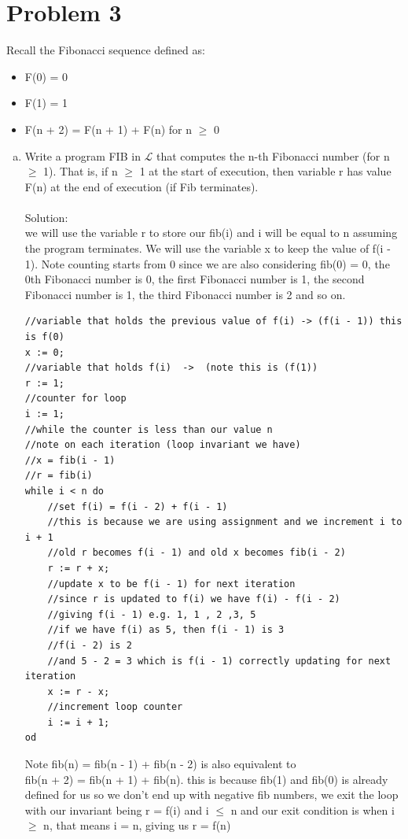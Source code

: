 \documentclass{article}
\newcommand*\moveToRight[1]{\hspace*{0em plus 1fill}\makebox{(#1)}}
\begin{document}
\section{Problem 3}
Recall the Fibonacci sequence defined as:
\begin{itemize}
    \item F(0) = 0
    \item F(1) = 1
    \item F(n + 2) = F(n + 1) + F(n) for n $\geq$ 0
\end{itemize}
    \begin{enumerate}[(a)]
        \item Write a program FIB in $\mathcal{L}$ that computes the n-th Fibonacci number (for n $\geq$ 1). That is, if n $\geq$ 1 at the start of execution, then variable r has value F(n) at the end of execution (if Fib terminates). \moveToRight{12 marks}\\\\
        Solution:\\
        we will use the variable r to store our fib(i) and i will be equal to n assuming the program terminates. We will use the variable x to keep the value of f(i - 1). Note counting starts from 0 since we are also considering fib(0) = 0, the 0th Fibonacci number is 0, the first Fibonacci number is 1, the second Fibonacci number is 1, the third Fibonacci number is 2 and so on.
    \begin{lstlisting}[language=Maple,mathescape=true]
//variable that holds the previous value of f(i) -> (f(i - 1)) this is f(0)
x := 0;
//variable that holds f(i)  ->  (note this is (f(1))
r := 1;
//counter for loop
i := 1;
//while the counter is less than our value n
//note on each iteration (loop invariant we have)
//x = fib(i - 1)
//r = fib(i)
while i < n do
    //set f(i) = f(i - 2) + f(i - 1)
    //this is because we are using assignment and we increment i to i + 1
    //old r becomes f(i - 1) and old x becomes fib(i - 2)
    r := r + x;
    //update x to be f(i - 1) for next iteration
    //since r is updated to f(i) we have f(i) - f(i - 2)
    //giving f(i - 1) e.g. 1, 1 , 2 ,3, 5
    //if we have f(i) as 5, then f(i - 1) is 3
    //f(i - 2) is 2
    //and 5 - 2 = 3 which is f(i - 1) correctly updating for next iteration
    x := r - x;
    //increment loop counter
    i := i + 1;
od
    \end{lstlisting}
    Note fib(n) = fib(n - 1) + fib(n - 2) is also equivalent to \\fib(n + 2) = fib(n + 1) + fib(n). this is because fib(1) and fib(0) is already defined for us so we don't end up with negative fib numbers, we exit the loop with our invariant being r = f(i) and i $\leq$ n and our exit condition is when i $\geq$ n, that means i = n, giving us r = f(n)\\
    

\end{enumerate}
\end{document}
